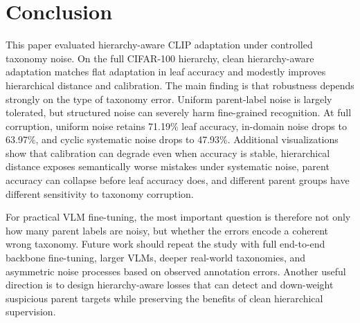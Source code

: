\documentclass[runningheads]{llncs}
\begin{document}
\section{Conclusion}
This paper evaluated hierarchy-aware CLIP adaptation under controlled taxonomy
noise. On the full CIFAR-100 hierarchy, clean hierarchy-aware adaptation
matches flat adaptation in leaf accuracy and modestly improves hierarchical
distance and calibration. The main finding is that robustness depends strongly
on the type of taxonomy error. Uniform parent-label noise is largely tolerated,
but structured noise can severely harm fine-grained recognition. At full
corruption, uniform noise retains 71.19\% leaf accuracy, in-domain noise drops
to 63.97\%, and cyclic systematic noise drops to 47.93\%. Additional
visualizations show that calibration can degrade even when accuracy is stable,
hierarchical distance exposes semantically worse mistakes under systematic
noise, parent accuracy can collapse before leaf accuracy does, and different
parent groups have different sensitivity to taxonomy corruption.

For practical VLM fine-tuning, the most important question is therefore not
only how many parent labels are noisy, but whether the errors encode a coherent
wrong taxonomy. Future work should repeat the study with full end-to-end
backbone fine-tuning, larger VLMs, deeper real-world taxonomies, and asymmetric
noise processes based on observed annotation errors. Another useful direction
is to design hierarchy-aware losses that can detect and down-weight suspicious
parent targets while preserving the benefits of clean hierarchical supervision.
\end{document}
